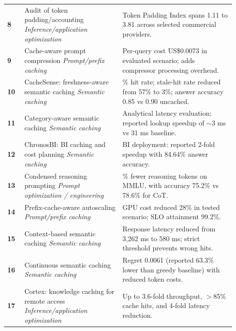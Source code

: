 \IfFileExists{jair.cls}{\documentclass{jair}}{\documentclass[manuscript,nonacm,screen]{acmart}}
\begin{document}
{\begin{longtable}{@{}>{\RaggedRight\arraybackslash}p{0.07\linewidth} >{\RaggedRight\arraybackslash}p{0.40\linewidth} >{\RaggedRight\arraybackslash}p{0.46\linewidth}@{}}
\textbf{8} & Audit of token padding/accounting \cite{S08}\newline\emph{Inference/application optimization} & Token Padding Index spans 1.11 to 3.81 across selected commercial providers. \\
\textbf{9} & Cache-aware prompt compression \cite{S09}\newline\emph{Prompt/prefix caching} & Per-query cost US\$0.0073 in evaluated scenario; adds compressor processing overhead. \\
\textbf{10} & CacheSense: freshness-aware semantic caching \cite{S10}\newline\emph{Semantic caching} & 53\% hit rate; stale-hit rate reduced from 57\% to 3\%; answer accuracy 0.85 vs 0.90 uncached. \\
\textbf{11} & Category-aware semantic caching \cite{S11}\newline\emph{Semantic caching} & Analytical latency evaluation; reported lookup speedup of $\sim$3 ms vs 31 ms baseline. \\
\textbf{12} & ChronosBI: BI caching and cost planning \cite{S12}\newline\emph{Semantic caching} & BI deployment: reported 2-fold speedup with 84.64\% answer accuracy. \\
\textbf{13} & Condensed reasoning prompting \cite{S13}\newline\emph{Prompt optimization / engineering} & 53.1\% fewer reasoning tokens on MMLU, with accuracy 75.2\% vs 78.6\% for CoT. \\
\textbf{14} & Prefix-cache-aware autoscaling \cite{S14}\newline\emph{Prompt/prefix caching} & GPU cost reduced 28\% in tested scenario; SLO attainment 99.2\%. \\
\textbf{15} & Context-based semantic caching \cite{S15}\newline\emph{Semantic caching} & Response latency reduced from 3,262 ms to 580 ms; strict threshold prevents wrong hits. \\
\textbf{16} & Continuous semantic caching \cite{S16}\newline\emph{Semantic caching} & Regret 0.0061 (reported 63.3\% lower than greedy baseline) with reduced token costs. \\
\textbf{17} & Cortex: knowledge caching for remote access \cite{S17}\newline\emph{Inference/application optimization} & Up to 3.6-fold throughput, $>$85\% cache hits, and 4-fold latency reduction. \\

\end{longtable}}
\end{document}
